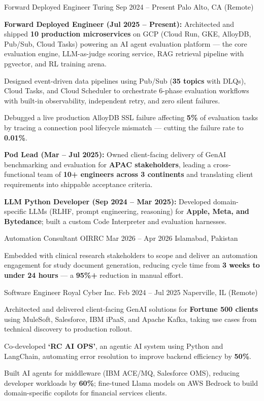 \documentclass[letterpaper]{resume_config}
\begin{document}
\WorkExperience
    {Forward Deployed Engineer} %
    {Turing} %
    {Sep 2024 -- Present} %
    {Palo Alto, CA (Remote)} %
    {
        \item \textbf{Forward Deployed Engineer (Jul 2025 -- Present):} Architected and shipped \textbf{10 production microservices} on GCP (Cloud Run, GKE, AlloyDB, Pub/Sub, Cloud Tasks) powering an AI agent evaluation platform --- the core evaluation engine, LLM-as-judge scoring service, RAG retrieval pipeline with pgvector, and RL training arena.
        \item Designed event-driven data pipelines using Pub/Sub (\textbf{35 topics} with DLQs), Cloud Tasks, and Cloud Scheduler to orchestrate 6-phase evaluation workflows with built-in observability, independent retry, and zero silent failures.
        \item Debugged a live production AlloyDB SSL failure affecting \textbf{5\%} of evaluation tasks by tracing a connection pool lifecycle mismatch --- cutting the failure rate to \textbf{0.01\%}.
        \item \textbf{Pod Lead (Mar -- Jul 2025):} Owned client-facing delivery of GenAI benchmarking and evaluation for \textbf{APAC stakeholders}, leading a cross-functional team of \textbf{10+ engineers across 3 continents} and translating client requirements into shippable acceptance criteria.
        \item \textbf{LLM Python Developer (Sep 2024 -- Mar 2025):} Developed domain-specific LLMs (RLHF, prompt engineering, reasoning) for \textbf{Apple, Meta, and Bytedance}; built a custom Code Interpreter and evaluation harnesses.
    }


\WorkExperience
    {Automation Consultant} %
    {OIRRC} %
    {Mar 2026 -- Apr 2026} %
    {Islamabad, Pakistan} %
    {
        \item Embedded with clinical research stakeholders to scope and deliver an automation engagement for study document generation, reducing cycle time from \textbf{3 weeks to under 24 hours} --- a \textbf{95\%+} reduction in manual effort.
    }


\WorkExperience
    {Software Engineer} %
    {Royal Cyber Inc.} %
    {Feb 2024 -- Jul 2025} %
    {Naperville, IL (Remote)} %
    {
        \item Architected and delivered client-facing GenAI solutions for \textbf{Fortune 500 clients} using MuleSoft, Salesforce, IBM iPaaS, and Apache Kafka, taking use cases from technical discovery to production rollout.
        \item Co-developed \textbf{`RC AI OPS'}, an agentic AI system using Python and LangChain, automating error resolution to improve backend efficiency by \textbf{50\%}.
        \item Built AI agents for middleware (IBM ACE/MQ, Salesforce OMS), reducing developer workloads by \textbf{60\%}; fine-tuned Llama models on AWS Bedrock to build domain-specific copilots for financial services clients.
    }
\end{document}
